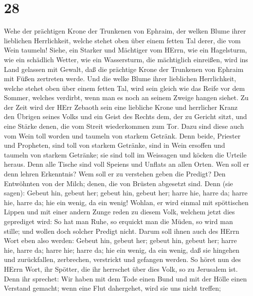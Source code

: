\hypertarget{section-27}{%
\section{28}\label{section-27}}

 Wehe der prächtigen Krone der Trunkenen von Ephraim, der
welken Blume ihrer lieblichen Herrlichkeit, welche stehet oben über
einem fetten Tal derer, die vom Wein taumeln!  Siehe, ein
Starker und Mächtiger vom HErrn, wie ein Hagelsturm, wie ein schädlich
Wetter, wie ein Wassersturm, die mächtiglich einreißen, wird ins Land
gelassen mit Gewalt,  daß die prächtige Krone der Trunkenen
von Ephraim mit Füßen zertreten werde.  Und die welke Blume
ihrer lieblichen Herrlichkeit, welche stehet oben über einem fetten Tal,
wird sein gleich wie das Reife vor dem Sommer, welches verdirbt, wenn
man es noch an seinem Zweige hangen siehet.  Zu der Zeit
wird der HErr Zebaoth sein eine liebliche Krone und herrlicher Kranz den
Übrigen seines Volks  und ein Geist des Rechts dem, der zu
Gericht sitzt, und eine Stärke denen, die vom Streit wiederkommen zum
Tor.  Dazu sind diese auch vom Wein toll worden und taumeln
von starkem Getränk. Denn beide, Priester und Propheten, sind toll von
starkem Getränke, sind in Wein ersoffen und taumeln von starkem
Getränke; sie sind toll im Weissagen und köcken die Urteile heraus.
 Denn alle Tische sind voll Speiens und Unflats an allen
Orten.  Wen soll er denn lehren Erkenntnis? Wem soll er zu
verstehen geben die Predigt? Den Entwöhnten von der Milch; denen, die
von Brüsten abgesetzt sind.  Denn (sie sagen): Gebeut hin,
gebeut her; gebeut hin, gebeut her; harre hie, harre da; harre hie,
harre da; hie ein wenig, da ein wenig!  Wohlan, er wird
einmal mit spöttischen Lippen und mit einer andern Zunge reden zu diesem
Volk, welchem jetzt dies geprediget wird:  So hat man Ruhe,
so erquickt man die Müden, so wird man stille; und wollen doch solcher
Predigt nicht.  Darum soll ihnen auch des HErrn Wort eben
also werden: Gebeut hin, gebeut her; gebeut hin, gebeut her; harre hie,
harre da; harre hie; harre da; hie ein wenig, da ein wenig, daß sie
hingehen und zurückfallen, zerbrechen, verstrickt und gefangen werden.
 So höret nun des HErrn Wort, ihr Spötter, die ihr
herrschet über dies Volk, so zu Jerusalem ist.  Denn ihr
sprechet: Wir haben mit dem Tode einen Bund und mit der Hölle einen
Verstand gemacht; wenn eine Flut dahergehet, wird sie uns nicht treffen;

